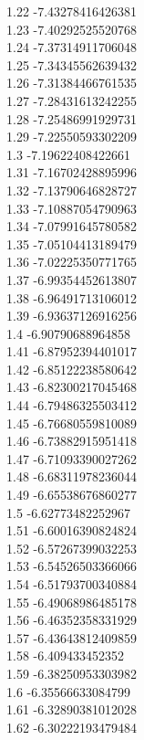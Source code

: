 {1.22	-7.43278416426381\\
1.23	-7.40292525520768\\
1.24	-7.37314911706048\\
1.25	-7.34345562639432\\
1.26	-7.31384466761535\\
1.27	-7.28431613242255\\
1.28	-7.25486991929731\\
1.29	-7.22550593302209\\
1.3	-7.19622408422661\\
1.31	-7.16702428895996\\
1.32	-7.13790646828727\\
1.33	-7.10887054790963\\
1.34	-7.07991645780582\\
1.35	-7.05104413189479\\
1.36	-7.02225350771765\\
1.37	-6.99354452613807\\
1.38	-6.96491713106012\\
1.39	-6.93637126916256\\
1.4	-6.90790688964858\\
1.41	-6.87952394401017\\
1.42	-6.85122238580642\\
1.43	-6.82300217045468\\
1.44	-6.79486325503412\\
1.45	-6.76680559810089\\
1.46	-6.73882915951418\\
1.47	-6.71093390027262\\
1.48	-6.68311978236044\\
1.49	-6.65538676860277\\
1.5	-6.62773482252967\\
1.51	-6.60016390824824\\
1.52	-6.57267399032253\\
1.53	-6.54526503366066\\
1.54	-6.51793700340884\\
1.55	-6.49068986485178\\
1.56	-6.46352358331929\\
1.57	-6.43643812409859\\
1.58	-6.409433452352\\
1.59	-6.38250953303982\\
1.6	-6.35566633084799\\
1.61	-6.32890381012028\\
1.62	-6.30222193479484\\
}
